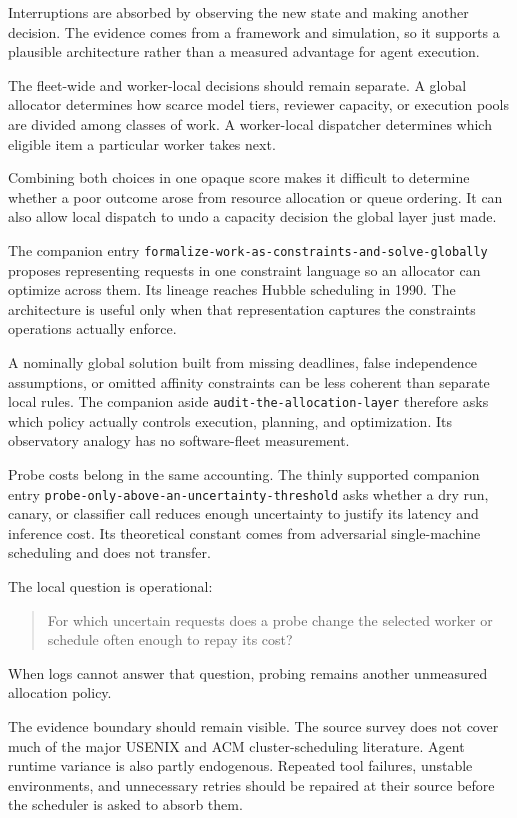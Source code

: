 Interruptions are absorbed by observing the new state and making another decision. The evidence comes from a framework and simulation, so it supports a plausible architecture rather than a measured advantage for agent execution.

The fleet-wide and worker-local decisions should remain separate. A global allocator determines how scarce model tiers, reviewer capacity, or execution pools are divided among classes of work. A worker-local dispatcher determines which eligible item a particular worker takes next.

Combining both choices in one opaque score makes it difficult to determine whether a poor outcome arose from resource allocation or queue ordering. It can also allow local dispatch to undo a capacity decision the global layer just made.

The companion entry \texttt{formalize-work-as-constraints-and-solve-globally} proposes representing requests in one constraint language so an allocator can optimize across them. Its lineage reaches Hubble scheduling in 1990. The architecture is useful only when that representation captures the constraints operations actually enforce.

A nominally global solution built from missing deadlines, false independence assumptions, or omitted affinity constraints can be less coherent than separate local rules. The companion aside \texttt{audit-the-allocation-layer} therefore asks which policy actually controls execution, planning, and optimization. Its observatory analogy has no software-fleet measurement.

Probe costs belong in the same accounting. The thinly supported companion entry \texttt{probe-only-above-an-uncertainty-threshold} asks whether a dry run, canary, or classifier call reduces enough uncertainty to justify its latency and inference cost. Its theoretical constant comes from adversarial single-machine scheduling and does not transfer.

The local question is operational:

\begin{quote}
For which uncertain requests does a probe change the selected worker or schedule often enough to repay its cost?
\end{quote}

When logs cannot answer that question, probing remains another unmeasured allocation policy.

The evidence boundary should remain visible. The source survey does not cover much of the major USENIX and ACM cluster-scheduling literature. Agent runtime variance is also partly endogenous. Repeated tool failures, unstable environments, and unnecessary retries should be repaired at their source before the scheduler is asked to absorb them.

